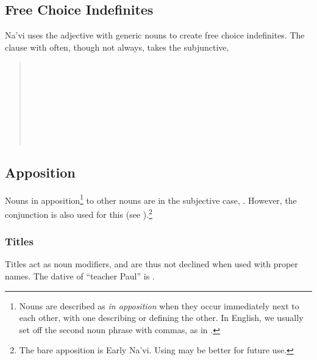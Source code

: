 \subsection{Free Choice Indefinites} Na'vi uses the adjective
  with generic nouns to
create free choice indefinites.  The clause with  often,
though not always, takes the subjunctive,

\begin{quotation}
\noindent{}\\
\indent{}\\
\noindent{}\\
\indent{}\\
\noindent{}\\
\indent{}\\
\noindent{}\\
\indent{}
\end{quotation}
\noindent{}

\subsection{Apposition} Nouns in apposition\footnote{Nouns are
described as \textit{in apposition} when they occur immediately next
to each other, with one describing or defining the other.  In English,
we usually set off the second noun phrase with commas, as in .}
to other nouns are in the subjective case,  .  However, the conjunction  is
also used for this (see ).\footnote{The bare
apposition is Early Na'vi.  Using  may be better for future
use.} 

\subsubsection{Titles} Titles act as noun modifiers, and are thus not
declined when used with proper names.  The dative of 
``teacher Paul'' is . 

